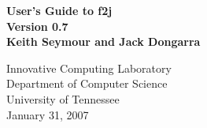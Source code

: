 \thispagestyle{empty}
\begin{center}
\huge
\bf
User's Guide to f2j \\
Version 0.7
\vspace*{1in} \mbox{} \\
\LARGE \rm
Keith Seymour and Jack Dongarra 

\vspace*{.5in}
Innovative Computing Laboratory\\
Department of Computer Science\\
University of Tennessee\\
\vspace*{.5in}
January 31, 2007
\end{center}
